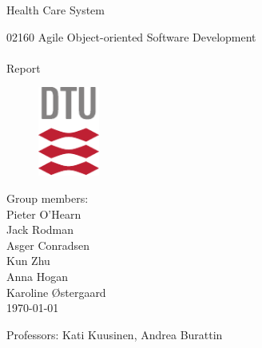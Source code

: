 \begin{titlepage}
	\begin{center}
		\rule{0pt}{0pt}
		\vfill
		\vfill
		\begin{minipage}{0.8\textwidth}
			\centering
			\begin{huge}
				Health Care System\\[0.75ex]
			\end{huge}
			\begin{LARGE}
				02160 Agile Object-oriented Software Development\\
				\noindent\makebox[\linewidth]{\rule{\textwidth}{0.4pt}}\\[0.75ex]
				Report\\[0.75ex]
				\noindent\makebox[\linewidth]{\rule{\textwidth}{0.4pt}}
			\end{LARGE}
		\end{minipage}
		\vfill
		\vfill

		\begin{figure}[h!]
		\begin{center}
			\includegraphics[width=2cm]{Figures/DTUlogo.pdf}
		\end{center}
		\end{figure}

		\vfill
		\vfill

		\vspace*{.5cm}
		Group members:\\
		\vspace*{.3cm}
		Pieter O'Hearn\\
		Jack Rodman\\
		Asger Conradsen\\
		Kun Zhu\\
		Anna Hogan\\
		Karoline Østergaard\\
		\vspace{.5cm}
		\today \\

		\vfill
		\vfill

		Professors:
		Kati Kuusinen, Andrea Burattin\

	\end{center}
\end{titlepage}
